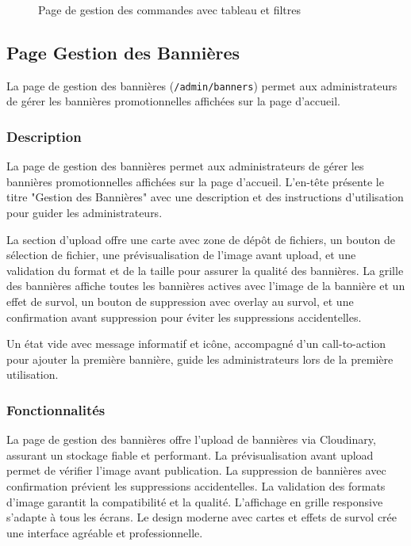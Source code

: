 \documentclass[12pt,a4paper]{article}
\begin{document}
\begin{figure}[H]
    \centering
    \caption{Page de gestion des commandes avec tableau et filtres}
    \label{fig:admin-orders}
\end{figure}

\subsection{Page Gestion des Bannières}

La page de gestion des bannières (\texttt{/admin/banners}) permet aux administrateurs de gérer les bannières promotionnelles affichées sur la page d'accueil.

\subsubsection{Description}

La page de gestion des bannières permet aux administrateurs de gérer les bannières promotionnelles affichées sur la page d'accueil. L'en-tête présente le titre "Gestion des Bannières" avec une description et des instructions d'utilisation pour guider les administrateurs.

La section d'upload offre une carte avec zone de dépôt de fichiers, un bouton de sélection de fichier, une prévisualisation de l'image avant upload, et une validation du format et de la taille pour assurer la qualité des bannières. La grille des bannières affiche toutes les bannières actives avec l'image de la bannière et un effet de survol, un bouton de suppression avec overlay au survol, et une confirmation avant suppression pour éviter les suppressions accidentelles.

Un état vide avec message informatif et icône, accompagné d'un call-to-action pour ajouter la première bannière, guide les administrateurs lors de la première utilisation.

\subsubsection{Fonctionnalités}

La page de gestion des bannières offre l'upload de bannières via Cloudinary, assurant un stockage fiable et performant. La prévisualisation avant upload permet de vérifier l'image avant publication. La suppression de bannières avec confirmation prévient les suppressions accidentelles. La validation des formats d'image garantit la compatibilité et la qualité. L'affichage en grille responsive s'adapte à tous les écrans. Le design moderne avec cartes et effets de survol crée une interface agréable et professionnelle.
\end{document}
